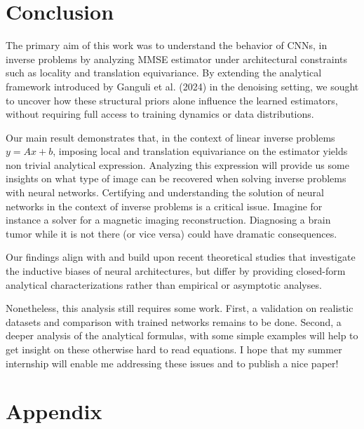 \documentclass[a4paper,10pt]{article}
\begin{document}

\section{Conclusion}
The primary aim of this work was to understand the behavior of CNNs, in inverse problems by analyzing MMSE estimator under architectural constraints such as locality and translation equivariance. By extending the analytical framework introduced by Ganguli et al. (2024) \cite{kamb2024analytictheorycreativityconvolutional} in the denoising setting, we sought to uncover how these structural priors alone influence the learned estimators, without requiring full access to training dynamics or data distributions.

Our main result demonstrates that, in the context of linear inverse problems $y=Ax+b$, imposing local and translation equivariance on the estimator yields non trivial analytical expression. 
Analyzing this expression will provide us some insights on what type of image can be recovered when solving inverse problems with neural networks. 
Certifying and understanding the solution of neural networks in the context of inverse problems is a critical issue. Imagine for instance a solver for a magnetic imaging reconstruction. 
Diagnosing a brain tumor while it is not there (or vice versa) could have dramatic consequences. 

Our findings align with and build upon recent theoretical studies that investigate the inductive biases of neural architectures, but differ by providing closed-form analytical characterizations rather than empirical or asymptotic analyses.

Nonetheless, this analysis still requires some work. First, a validation on realistic datasets and comparison with trained networks remains to be done. Second, a deeper analysis of the analytical formulas, with some simple examples will help to get insight on these otherwise hard to read equations. I hope that my summer internship will enable me addressing these issues and to publish a nice paper!

\section{Appendix}
\end{document}
